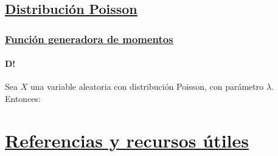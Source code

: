 \documentclass[8pt]{article}
\begin{document}
 
\subsection*{\hyperref[subsec:distribucion_poisson_tag]{Distribución Poisson}}
\label{subsec:distribucion_poisson}

\subsubsection*{\hyperref[subsec:funciongeneradora_poisson_tag]{Función generadora de momentos}}

\paragraph{D!} Sea $X$ una variable aleatoria con distribución Poisson, con parámetro $\lambda$. Entonces:






\section*{\hyperref[paragraph:assets_tag]{Referencias y recursos útiles}}
\label{paragraph:assets}
\end{document}
